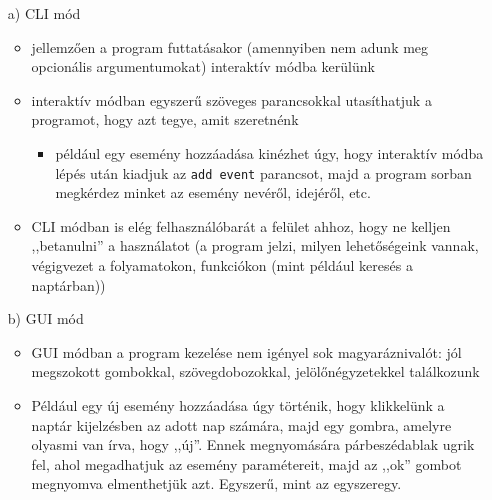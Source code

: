 \documentclass[a4paper]{article}
\begin{document}
	\begin{itemize}
		\item[a)] CLI mód
			\begin{itemize}
				\item jellemzően a program futtatásakor (amennyiben nem adunk meg opcionális argumentumokat) interaktív módba kerülünk
				\item interaktív módban egyszerű szöveges parancsokkal utasíthatjuk a programot, hogy azt tegye, amit szeretnénk
					\begin{itemize}
						\item például egy esemény hozzáadása kinézhet úgy, hogy interaktív módba lépés után kiadjuk az \texttt{add event} parancsot, majd a program sorban megkérdez minket az esemény nevéről, idejéről, etc.
					\end{itemize}
				\item CLI módban is elég felhasználóbarát a felület ahhoz, hogy ne kelljen ,,betanulni'' a használatot (a program jelzi, milyen lehetőségeink vannak, végigvezet a folyamatokon, funkciókon (mint például keresés a naptárban))
			\end{itemize}
		\item[b)] GUI mód
			\begin{itemize}
				\item GUI módban a program kezelése nem igényel sok magyaráznivalót: jól megszokott gombokkal, szövegdobozokkal, jelölőnégyzetekkel találkozunk
				\item Például egy új esemény hozzáadása úgy történik, hogy klikkelünk a naptár kijelzésben az adott nap számára, majd egy gombra, amelyre olyasmi van írva, hogy ,,új''. Ennek megnyomására párbeszédablak ugrik fel, ahol megadhatjuk az esemény paramétereit, majd az ,,ok'' gombot megnyomva elmenthetjük azt. Egyszerű, mint az egyszeregy.
			\end{itemize}	
	\end{itemize}
	
\end{document}

